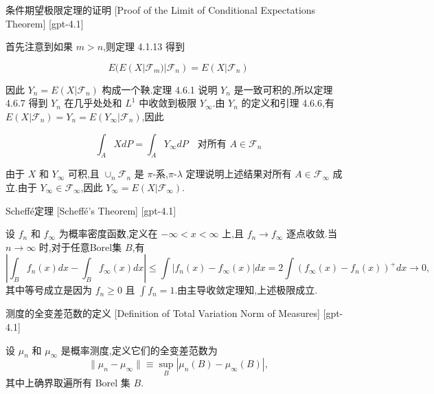\documentclass[UTF8]{ctexart}
\begin{document}
    
    
    \begin{prf}
        {条件期望极限定理的证明}
        [Proof of the Limit of Conditional Expectations Theorem]
        [gpt-4.1]
        
首先注意到如果 $m > n$,则定理 4.1.13 得到

\[
E(E(X|\mathcal{F}_{m})|\mathcal{F}_{n}) = E(X|\mathcal{F}_{n})
\]

因此 $Y_{n} = E(X|\mathcal{F}_{n})$ 构成一个鞅.定理 4.6.1 说明 $Y_{n}$ 是一致可积的,所以定理 4.6.7 得到 $Y_{n}$ 在几乎处处和 $L^{1}$ 中收敛到极限 $Y_{\infty}$.由 $Y_{n}$ 的定义和引理 4.6.6,有 $E(X|\mathcal{F}_{n}) = Y_{n} = E(Y_{\infty}|\mathcal{F}_{n})$,因此

\[
\int_{A} X dP = \int_{A} Y_{\infty} dP \quad \text{对所有 } A \in {\mathcal{F}}_{n}
\]

由于 $X$ 和 $Y_{\infty}$ 可积,且 $\cup_{n} {\mathcal{F}}_{n}$ 是 $\pi$-系,$\pi$-$\lambda$ 定理说明上述结果对所有 $A \in {\mathcal{F}}_{\infty}$ 成立.由于 $Y_{\infty} \in \mathcal{F}_{\infty}$,因此 $Y_{\infty} = E(X|\mathcal{F}_{\infty})$.

    \end{prf}
    
    
    
    \begin{thm}
        {Scheffé定理}
        [Scheffé's Theorem]
        [gpt-4.1]
        
设 $f_n$ 和 $f_\infty$ 为概率密度函数,定义在 $-\infty < x < \infty$ 上,且 $f_n \to f_\infty$ 逐点收敛.当 $n \to \infty$ 时,对于任意Borel集 $B$,有
\[
\left| \int_{B} f_{n}(x) dx - \int_{B} f_{\infty}(x) dx \right| \leq \int |f_{n}(x) - f_{\infty}(x)| dx = 2 \int (f_{\infty}(x) - f_{n}(x))^{+} dx \to 0,
\]
其中等号成立是因为 $f_n \geq 0$ 且 $\int f_n = 1$.由主导收敛定理知,上述极限成立.

    \end{thm}
    
    
    
    \begin{dfn}
        {测度的全变差范数的定义}
        [Definition of Total Variation Norm of Measures]
        [gpt-4.1]
        
设 $\mu_n$ 和 $\mu_\infty$ 是概率测度,定义它们的全变差范数为
\[
\| \mu_{n} - \mu_{\infty} \| \equiv \operatorname*{sup}_{B} |\mu_{n}(B) - \mu_{\infty}(B)|,
\]
其中上确界取遍所有 Borel 集 $B$.

    \end{dfn}
    
\end{document}
